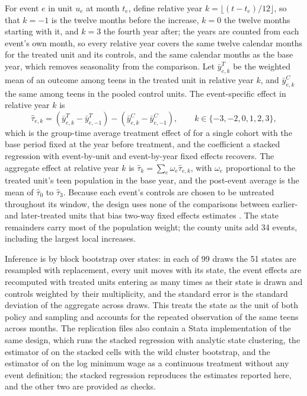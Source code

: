 \documentclass[12pt]{article}
\begin{document}
For event $e$ in unit $u_e$ at month $t_e$, define relative year $k = \lfloor (t - t_e)/12 \rfloor$, so that $k = -1$ is the twelve months before the increase, $k = 0$ the twelve months starting with it, and $k = 3$ the fourth year after; the years are counted from each event's own month, so every relative year covers the same twelve calendar months for the treated unit and its controls, and the same calendar months as the base year, which removes seasonality from the comparison. Let $\bar{y}^T_{e,k}$ be the weighted mean of an outcome among teens in the treated unit in relative year $k$, and $\bar{y}^C_{e,k}$ the same among teens in the pooled control units. The event-specific effect in relative year $k$ is
\begin{equation}
\hat\tau_{e,k} = \left( \bar{y}^T_{e,k} - \bar{y}^T_{e,-1} \right) - \left( \bar{y}^C_{e,k} - \bar{y}^C_{e,-1} \right), \qquad k \in \{-3,-2,0,1,2,3\},
\label{eq:did}
\end{equation}
which is the group-time average treatment effect of \citet{callaway2021} for a single cohort with the base period fixed at the year before treatment, and the coefficient a stacked regression with event-by-unit and event-by-year fixed effects recovers. The aggregate effect at relative year $k$ is $\hat\tau_k = \sum_e \omega_e \hat\tau_{e,k}$, with $\omega_e$ proportional to the treated unit's teen population in the base year, and the post-event average is the mean of $\hat\tau_0$ to $\hat\tau_3$. Because each event's controls are chosen to be untreated throughout its window, the design uses none of the comparisons between earlier- and later-treated units that bias two-way fixed effects estimates \citep{goodmanbacon2021,dechaisemartin2020,sun2021,baker2022}. The state remainders carry most of the population weight; the county units add 34 events, including the largest local increases.

Inference is by block bootstrap over states: in each of 99 draws the 51 states are resampled with replacement, every unit moves with its state, the event effects are recomputed with treated units entering as many times as their state is drawn and controls weighted by their multiplicity, and the standard error is the standard deviation of the aggregate across draws. This treats the state as the unit of both policy and sampling and accounts for the repeated observation of the same teens across months. The replication files also contain a Stata implementation of the same design, which runs the stacked regression with analytic state clustering, the estimator of \citet{callaway2021} on the stacked cells with the wild cluster bootstrap, and the estimator of \citet{dechaisemartin2024} on the log minimum wage as a continuous treatment without any event definition; the stacked regression reproduces the estimates reported here, and the other two are provided as checks.
\end{document}
